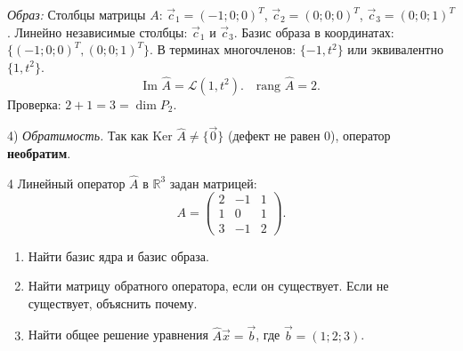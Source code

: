 \documentclass[12pt,a4paper]{article}
\theoremstyle{plain}
\theoremstyle{definition}
\begin{document}
\begin{solbox}
    \textit{Образ:} Столбцы матрицы $A$: $\vec{c}_1=(-1;0;0)^T$, $\vec{c}_2=(0;0;0)^T$, $\vec{c}_3=(0;0;1)^T$.
    Линейно независимые столбцы: $\vec{c}_1$ и $\vec{c}_3$.
    Базис образа в координатах: $\{(-1;0;0)^T, (0;0;1)^T\}$.
    В терминах многочленов: $\{-1, t^2\}$ или эквивалентно $\{1, t^2\}$.
    \[
    \text{Im } \hat{A} = \mathcal{L}(1, t^2). \quad \text{rang } \hat{A} = 2.
    \]
    Проверка: $2 + 1 = 3 = \dim P_2$.

    4) \textit{Обратимость.}
    Так как $\text{Ker } \hat{A} \neq \{\vec{0}\}$ (дефект не равен 0), оператор \textbf{необратим}.
\end{solbox}

\begin{taskbox}{4}
    Линейный оператор $\hat{A}$ в $\mathbb{R}^3$ задан матрицей:
    \[
    A = \begin{pmatrix} 2 & -1 & 1 \\ 1 & 0 & 1 \\ 3 & -1 & 2 \end{pmatrix}.
    \]
    \begin{enumerate}
        \item Найти базис ядра и базис образа.
        \item Найти матрицу обратного оператора, если он существует. Если не существует, объяснить почему.
        \item Найти общее решение уравнения $\hat{A}\vec{x} = \vec{b}$, где $\vec{b} = (1; 2; 3)$.
    \end{enumerate}
\end{taskbox}
\end{document}

